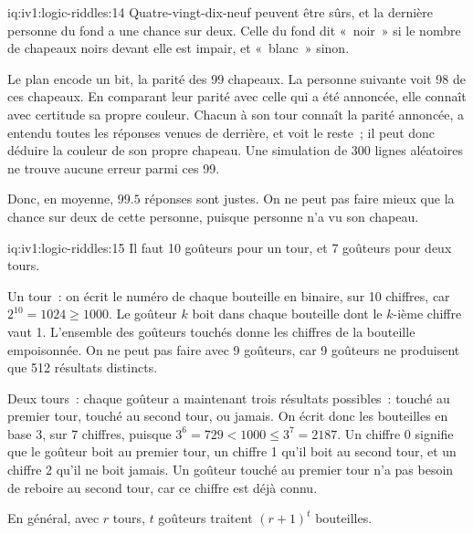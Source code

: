 \begin{solution}{iq:iv1:logic-riddles:14}
Quatre-vingt-dix-neuf peuvent être sûrs, et la dernière personne du fond a une chance sur deux. Celle du fond dit «~noir~» si le nombre de chapeaux noirs devant elle est impair, et «~blanc~» sinon.

Le plan encode un bit, la parité des 99 chapeaux. La personne suivante voit 98 de ces chapeaux. En comparant leur parité avec celle qui a été annoncée, elle connaît avec certitude sa propre couleur. Chacun à son tour connaît la parité annoncée, a entendu toutes les réponses venues de derrière, et voit le reste~; il peut donc déduire la couleur de son propre chapeau. Une simulation de 300 lignes aléatoires ne trouve aucune erreur parmi ces 99.

Donc, en moyenne, $99.5$ réponses sont justes. On ne peut pas faire mieux que la chance sur deux de cette personne, puisque personne n'a vu son chapeau.

\end{solution}

\begin{solution}{iq:iv1:logic-riddles:15}
Il faut 10 goûteurs pour un tour, et 7 goûteurs pour deux tours.

Un tour~: on écrit le numéro de chaque bouteille en binaire, sur 10 chiffres, car $2^{10} = 1024 \ge 1000$. Le goûteur $k$ boit dans chaque bouteille dont le $k$-ième chiffre vaut 1. L'ensemble des goûteurs touchés donne les chiffres de la bouteille empoisonnée. On ne peut pas faire avec 9 goûteurs, car 9 goûteurs ne produisent que 512 résultats distincts.

Deux tours~: chaque goûteur a maintenant trois résultats possibles~: touché au premier tour, touché au second tour, ou jamais. On écrit donc les bouteilles en base 3, sur 7 chiffres, puisque $3^6 = 729 < 1000 \le 3^7 = 2187$. Un chiffre 0 signifie que le goûteur boit au premier tour, un chiffre 1 qu'il boit au second tour, et un chiffre 2 qu'il ne boit jamais. Un goûteur touché au premier tour n'a pas besoin de reboire au second tour, car ce chiffre est déjà connu.

En général, avec $r$ tours, $t$ goûteurs traitent $(r + 1)^t$ bouteilles.

\end{solution}

